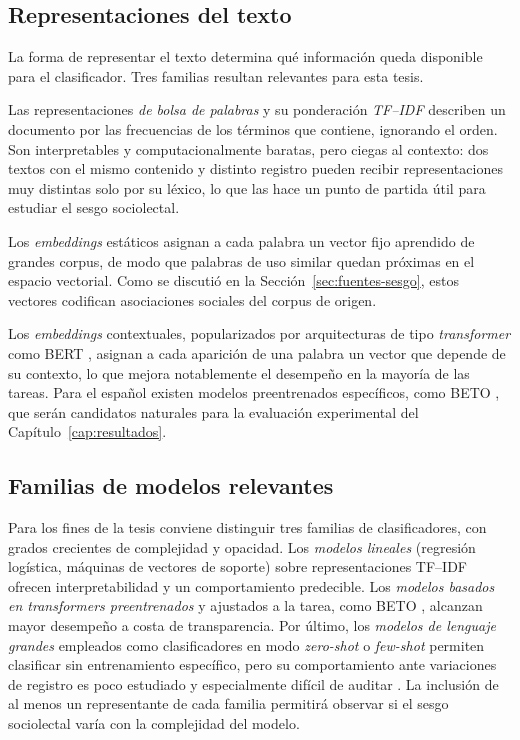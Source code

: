 \subsection{Representaciones del texto}
\label{sec:representaciones}

La forma de representar el texto determina qué información queda disponible para
el clasificador. Tres familias resultan relevantes para esta tesis.

Las representaciones \emph{de bolsa de palabras} y su ponderación
\emph{TF--IDF} describen un documento por las frecuencias de los términos que
contiene, ignorando el orden. Son interpretables y computacionalmente baratas,
pero ciegas al contexto: dos textos con el mismo contenido y distinto registro
pueden recibir representaciones muy distintas solo por su léxico, lo que las
hace un punto de partida útil para estudiar el sesgo sociolectal.

Los \emph{embeddings} estáticos asignan a cada palabra un vector fijo aprendido
de grandes corpus, de modo que palabras de uso similar quedan próximas en el
espacio vectorial. Como se discutió en la Sección~\ref{sec:fuentes-sesgo}, estos
vectores codifican asociaciones sociales del corpus de origen.

Los \emph{embeddings} contextuales, popularizados por arquitecturas de tipo
\emph{transformer} como BERT \cite{Devlin2019BERT}, asignan a cada aparición de
una palabra un vector que depende de su contexto, lo que mejora notablemente el
desempeño en la mayoría de las tareas. Para el español existen modelos
preentrenados específicos, como BETO \cite{CanetePilar2020BETO}, que serán
candidatos naturales para la evaluación experimental del
Capítulo~\ref{cap:resultados}.

\subsection{Familias de modelos relevantes}
\label{sec:familias-modelos}

Para los fines de la tesis conviene distinguir tres familias de clasificadores,
con grados crecientes de complejidad y opacidad. Los \emph{modelos lineales}
(regresión logística, máquinas de vectores de soporte) sobre representaciones
TF--IDF ofrecen interpretabilidad y un comportamiento predecible. Los
\emph{modelos basados en \emph{transformers} preentrenados} y ajustados a la
tarea, como BETO \cite{CanetePilar2020BETO}, alcanzan mayor desempeño a costa de
transparencia. Por último, los \emph{modelos de lenguaje grandes} empleados como
clasificadores en modo \emph{zero-shot} o \emph{few-shot} permiten clasificar sin
entrenamiento específico, pero su comportamiento ante variaciones de registro
es poco estudiado y especialmente difícil de auditar \cite{Bender2021Parrots}.
La inclusión de al menos un representante de cada familia permitirá observar si
el sesgo sociolectal varía con la complejidad del modelo.

